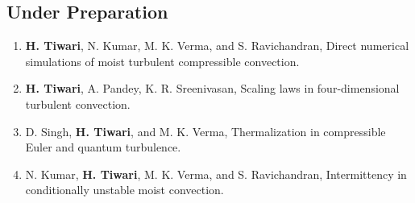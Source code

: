 \documentclass[10pt,a4paper]{article}
\begin{document}
\subsection*{Under Preparation}
\begin{enumerate}[leftmargin=1.5em, itemsep=3pt, parsep=0pt]
  \item \textbf{H. Tiwari}, N. Kumar, M. K. Verma, and S. Ravichandran, Direct numerical simulations of moist turbulent compressible convection.
  \item \textbf{H. Tiwari}, A. Pandey, K. R. Sreenivasan, Scaling laws in four-dimensional turbulent convection.
  \item D. Singh, \textbf{H. Tiwari}, and M. K. Verma, Thermalization in compressible Euler and quantum turbulence.
  \item N. Kumar, \textbf{H. Tiwari}, M. K. Verma, and S. Ravichandran, Intermittency in conditionally unstable moist convection.
\end{enumerate}

\end{document}
